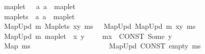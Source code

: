 \begin{isabellebody}
\ \ {\isachardoublequoteopen}{\isacharunderscore}{\kern0pt}maplet{\isachardoublequoteclose}\ \ {\isacharcolon}{\kern0pt}{\isacharcolon}{\kern0pt}\ {\isachardoublequoteopen}{\isacharbrackleft}{\kern0pt}{\isacharprime}{\kern0pt}a{\isacharcomma}{\kern0pt}\ {\isacharprime}{\kern0pt}a{\isacharbrackright}{\kern0pt}\ {\isasymRightarrow}\ maplet{\isachardoublequoteclose}\ \ \ \ \ \ \ \ \ \ \ \ \ {\isacharparenleft}{\kern0pt}{\isachardoublequoteopen}{\isacharunderscore}{\kern0pt}\ {\isacharslash}{\kern0pt}{\isacharbar}{\kern0pt}{\isacharminus}{\kern0pt}{\isachargreater}{\kern0pt}{\isacharslash}{\kern0pt}\ {\isacharunderscore}{\kern0pt}{\isachardoublequoteclose}{\isacharparenright}{\kern0pt}\isanewline
\ \ {\isachardoublequoteopen}{\isacharunderscore}{\kern0pt}maplets{\isachardoublequoteclose}\ {\isacharcolon}{\kern0pt}{\isacharcolon}{\kern0pt}\ {\isachardoublequoteopen}{\isacharbrackleft}{\kern0pt}{\isacharprime}{\kern0pt}a{\isacharcomma}{\kern0pt}\ {\isacharprime}{\kern0pt}a{\isacharbrackright}{\kern0pt}\ {\isasymRightarrow}\ maplet{\isachardoublequoteclose}\ \ \ \ \ \ \ \ \ \ \ \ \ {\isacharparenleft}{\kern0pt}{\isachardoublequoteopen}{\isacharunderscore}{\kern0pt}\ {\isacharslash}{\kern0pt}{\isacharbrackleft}{\kern0pt}{\isacharbar}{\kern0pt}{\isacharminus}{\kern0pt}{\isachargreater}{\kern0pt}{\isacharbrackright}{\kern0pt}{\isacharslash}{\kern0pt}\ {\isacharunderscore}{\kern0pt}{\isachardoublequoteclose}{\isacharparenright}{\kern0pt}\isanewline
\isanewline
{}\isamarkupfalse%
\isanewline
\ \ {\isachardoublequoteopen}{\isacharunderscore}{\kern0pt}MapUpd\ m\ {\isacharparenleft}{\kern0pt}{\isacharunderscore}{\kern0pt}Maplets\ xy\ ms{\isacharparenright}{\kern0pt}{\isachardoublequoteclose}\ \ {\isasymrightleftharpoons}\ {\isachardoublequoteopen}{\isacharunderscore}{\kern0pt}MapUpd\ {\isacharparenleft}{\kern0pt}{\isacharunderscore}{\kern0pt}MapUpd\ m\ xy{\isacharparenright}{\kern0pt}\ ms{\isachardoublequoteclose}\isanewline
\ \ {\isachardoublequoteopen}{\isacharunderscore}{\kern0pt}MapUpd\ m\ {\isacharparenleft}{\kern0pt}{\isacharunderscore}{\kern0pt}maplet\ \ x\ y{\isacharparenright}{\kern0pt}{\isachardoublequoteclose}\ \ \ \ {\isasymrightleftharpoons}\ {\isachardoublequoteopen}m{\isacharparenleft}{\kern0pt}x\ {\isacharcolon}{\kern0pt}{\isacharequal}{\kern0pt}\ CONST\ Some\ y{\isacharparenright}{\kern0pt}{\isachardoublequoteclose}\isanewline
\ \ {\isachardoublequoteopen}{\isacharunderscore}{\kern0pt}Map\ ms{\isachardoublequoteclose}\ \ \ \ \ \ \ \ \ \ \ \ \ \ \ \ \ \ \ \ \ {\isasymrightleftharpoons}\ {\isachardoublequoteopen}{\isacharunderscore}{\kern0pt}MapUpd\ {\isacharparenleft}{\kern0pt}CONST\ empty{\isacharparenright}{\kern0pt}\ ms{\isachardoublequoteclose}\isanewline

\end{isabellebody}
